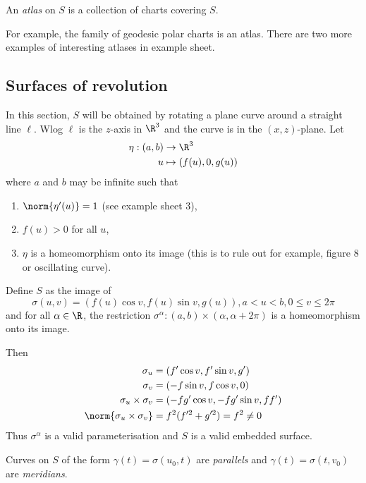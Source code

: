 \documentclass[a4paper]{article}
\theoremstyle{definition}
\begin{document}
\begin{definition}[Atlas]
  An \emph{atlas} on \(S\) is a collection of charts covering \(S\).
\end{definition}

For example, the family of geodesic polar charts is an atlas. There are two more examples of interesting atlases in example sheet.

\subsection{Surfaces of revolution}

In this section, \(S\) will be obtained by rotating a plane curve around a straight line \(\ell\). Wlog \(\ell\) is the \(z\)-axis in \(\R^3\) and the curve is in the \((x, z)\)-plane. Let
\begin{align*}
  \eta: (a, b) &\to \R^3 \\
  u &\mapsto (f(u), 0, g(u))
\end{align*}
where \(a\) and \(b\) may be infinite such that
\begin{enumerate}
\item \(\norm{\eta'(u)} = 1\) (see example sheet 3),
\item \(f(u) > 0\) for all \(u\),
\item \(\eta\) is a homeomorphism onto its image (this is to rule out for example, figure 8 or oscillating curve).
\end{enumerate}

Define \(S\) as the image of
\[
  \sigma(u, v) = (f(u) \cos v, f(u) \sin v, g(u)), a < u < b, 0 \leq v \leq 2\pi
\]
and for all \(\alpha \in \R\), the restriction \(\sigma^\alpha: (a, b) \times (\alpha, \alpha + 2\pi)\) is a homeomorphism onto its image.

Then
\begin{align*}
  \sigma_u &= (f' \cos v, f' \sin v, g') \\
  \sigma_v &= (-f \sin v, f \cos v, 0) \\
  \sigma_u \times \sigma_v &= (-fg' \cos v, -fg' \sin v, ff') \\
  \norm{\sigma_u \times \sigma_v} &= f^2(f'^2 + g'^2) = f^2 \neq 0
\end{align*}
Thus \(\sigma^\alpha\) is a valid parameterisation and \(S\) is a valid embedded surface.

\begin{definition}
  Curves on \(S\) of the form \(\gamma(t) = \sigma(u_0, t)\) are \emph{parallels} and \(\gamma(t) = \sigma(t, v_0)\) are \emph{meridians}.
\end{definition}
\end{document}
